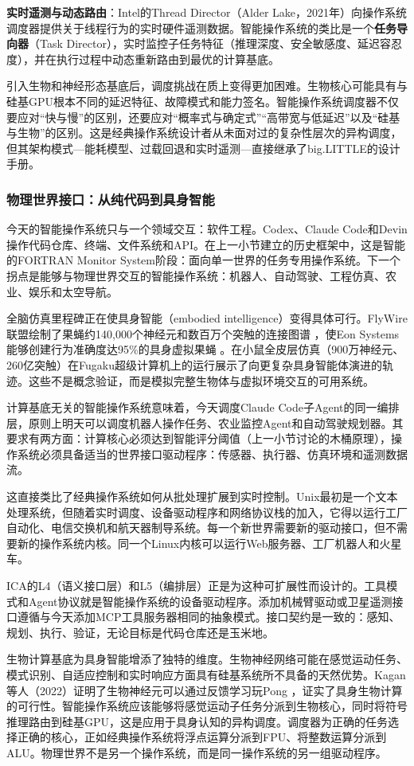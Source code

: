 \textbf{实时遥测与动态路由}：Intel的Thread Director（Alder Lake，2021年）向操作系统调度器提供关于线程行为的实时硬件遥测数据。智能操作系统的类比是一个\textbf{任务导向器}（Task Director），实时监控子任务特征（推理深度、安全敏感度、延迟容忍度），并在执行过程中动态重新路由到最优的计算基底。

引入生物和神经形态基底后，调度挑战在质上变得更加困难。生物核心可能具有与硅基GPU根本不同的延迟特征、故障模式和能力签名。智能操作系统调度器不仅要应对``快与慢''的区别，还要应对``概率式与确定式''``高带宽与低延迟''以及``硅基与生物''的区别。这是经典操作系统设计者从未面对过的复杂性层次的异构调度，但其架构模式---能耗模型、过载回退和实时遥测---直接继承了big.LITTLE的设计手册。

\subsubsection{物理世界接口：从纯代码到具身智能}

今天的智能操作系统只与一个领域交互：软件工程。Codex、Claude Code和Devin操作代码仓库、终端、文件系统和API。在上一小节建立的历史框架中，这是智能的FORTRAN Monitor System阶段：面向单一世界的任务专用操作系统。下一个拐点是能够与物理世界交互的智能操作系统：机器人、自动驾驶、工程仿真、农业、娱乐和太空导航。

全脑仿真里程碑正在使具身智能（embodied intelligence）变得具体可行。FlyWire联盟绘制了果蝇约140,000个神经元和数百万个突触的连接图谱 \cite{flywire_2024}，使Eon Systems能够创建行为准确度达95\%的具身虚拟果蝇 \cite{eon_systems_2025_virtual_fly}。在小鼠全皮层仿真（900万神经元、260亿突触）在Fugaku超级计算机上的运行展示了向更复杂具身智能体演进的轨迹。这些不是概念验证，而是模拟完整生物体与虚拟环境交互的可用系统。

计算基底无关的智能操作系统意味着，今天调度Claude Code子Agent的同一编排层，原则上明天可以调度机器人操作任务、农业监控Agent和自动驾驶规划器。其要求有两方面：计算核心必须达到智能评分阈值（上一小节讨论的木桶原理），操作系统必须具备适当的世界接口驱动程序：传感器、执行器、仿真环境和遥测数据流。

这直接类比了经典操作系统如何从批处理扩展到实时控制。Unix最初是一个文本处理系统，但随着实时调度、设备驱动程序和网络协议栈的加入，它得以运行工厂自动化、电信交换机和航天器制导系统。每一个新世界需要新的驱动接口，但不需要新的操作系统内核。同一个Linux内核可以运行Web服务器、工厂机器人和火星车。

ICA的L4（语义接口层）和L5（编排层）正是为这种可扩展性而设计的。工具模式和Agent协议就是智能操作系统的设备驱动程序。添加机械臂驱动或卫星遥测接口遵循与今天添加MCP工具服务器相同的抽象模式。接口契约是一致的：感知、规划、执行、验证，无论目标是代码仓库还是玉米地。

生物计算基底为具身智能增添了独特的维度。生物神经网络可能在感觉运动任务、模式识别、自适应控制和实时响应方面具有硅基系统所不具备的天然优势。Kagan等人（2022）证明了生物神经元可以通过反馈学习玩Pong \cite{kagan_2022_pong_bioneurons}，证实了具身生物计算的可行性。智能操作系统应该能够将感觉运动子任务分派到生物核心，同时将符号推理路由到硅基GPU，这是应用于具身认知的异构调度。调度器为正确的任务选择正确的核心，正如经典操作系统将浮点运算分派到FPU、将整数运算分派到ALU。物理世界不是另一个操作系统，而是同一操作系统的另一组驱动程序。


